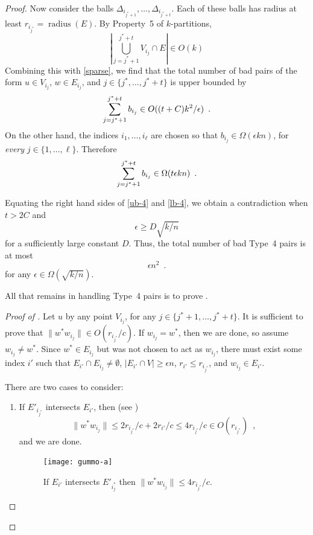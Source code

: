 \documentclass{patmorin}
\DeclareMathOperator{\radius}{radius}
\begin{document}
\begin{proof}
  Now consider the balls
  $\Delta_{i_{j^*+1}},\ldots,\Delta_{i_{j^*+t}}$. Each of these balls
  has radius at least $r_{i_{j^*}}=\radius(E)$.  By Property~5 of
  $k$-partitions,
  \[
    \left|\bigcup_{j=j^*+1}^{j^*+t} V_{i_{j}}\cap E\right|
      \in O(k)
  \]
  Combining this with \eqref{sparse}, we find that the total number
  of bad pairs of the form $u\in V_{i_{j}}$, $w\in E_{i_{j}}$,
  and $j\in\{j^*,\ldots,j^*+t\}$ is upper bounded by
  \begin{equation}
     \sum_{j=j^*+1}^{j^*+t} b_{i_{j}} 
        \in O((t+C)k^2/\epsilon) \enspace . \eqlabel{ub-4}
  \end{equation}
  On the other hand, the indices $i_1,\ldots,i_\ell$ are chosen
  so that $b_{i_j}\in\Omega(\epsilon kn)$, for \emph{every}
  $j\in\{1,\ldots,\ell\}$.  Therefore
  \begin{equation}
    \sum_{j=j^*+1}^{j^*+t} b_{i_{j}} 
        \in \Omega(t\epsilon kn) \enspace .
        \eqlabel{lb-4}
  \end{equation}
 
  Equating the right hand sides of \eqref{ub-4} and \eqref{lb-4}, we
  obtain a contradiction when $t>2C$ and
  \[
      \epsilon \ge D\sqrt{k/n}
  \] 
  for a sufficiently large constant $D$.
  Thus, the total number of bad Type~4 pairs is at most
  \[
    \epsilon n^2 \enspace .
  \]
  for any $\epsilon \in \Omega(\sqrt{k/n})$. 

  All that remains in handling Type~4 pairs is to prove .

  \begin{proof}[Proof of ]
  Let $u$ by any point $V_{i_{j}}$, for any $j\in\{j^*+1,\ldots,j^*+t\}$.
  It is sufficient to prove that $\|w^*w_{i_{j}}\|\in O(r_{i_{j^*}}/c)$.
  If $w_{i_{j}}=w^*$, then we are done, so assume $w_{i_{j}}\neq
  w^*$.  Since $w^*\in E_{i_{j}}$ but was not chosen to act as
  $w_{i_{j}}$, there must exist some index $i'$ such that $E_{i'}\cap
  E_{i_{j}}\neq\emptyset$, $|E_{i'}\cap V|\ge\epsilon n$, $r_{i'}\le
  r_{i_{j^*}}$, and $w_{i_{j}}\in E_{i'}$.

  There are two cases to consider:
  \begin{enumerate}
    \item 
    If $E'_{i_{j^*}}$ intersects $E_{i'}$, then (see )
    \[
       \|w^*w_{i_j}\|\le 2r_{i_{j^*}}/c + 2r_{i'}/c \le 4r_{i_{j^*}}/c \in O(r_{i_{j^*}}) \enspace ,
    \]
    and we are done. 
    \begin{figure}
      \begin{center}
        \texttt{[image: gummo-a]}
        \caption{If $E_{i'}$ intersects $E'_{i_j^*}$ then $\|w^*w_{i_j}\|\le 4r_{i_{j^*}}/c$.}
      \end{center}
    \end{figure}
  

\end{enumerate}
\end{proof}
\end{proof}
\end{document}
